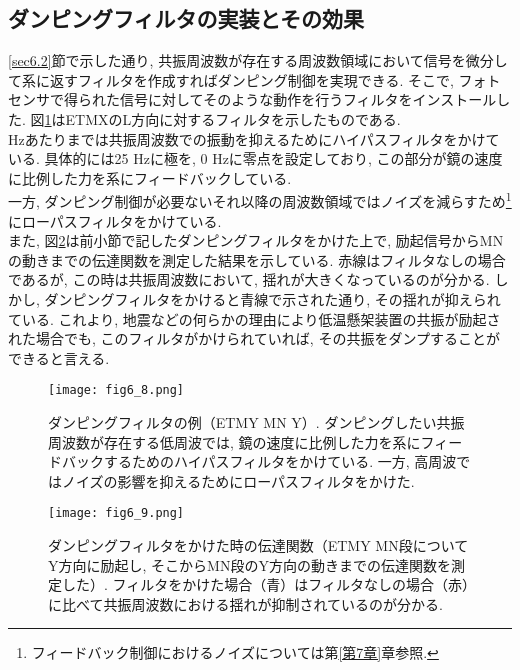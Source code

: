 \subsection{ダンピングフィルタの実装とその効果}
\ref{sec6.2}節で示した通り, 共振周波数が存在する周波数領域において信号を微分して系に返すフィルタを作成すればダンピング制御を実現できる. そこで, フォトセンサで得られた信号に対してそのような動作を行うフィルタをインストールした. 図\ref{fig6.8}はETMXのL方向に対するフィルタを示したものである. \\
 Hzあたりまでは共振周波数での振動を抑えるためにハイパスフィルタをかけている. 具体的には25 Hzに極を, 0 Hzに零点を設定しており, この部分が鏡の速度に比例した力を系にフィードバックしている. \\
\quad 一方, ダンピング制御が必要ないそれ以降の周波数領域ではノイズを減らすため\footnote{フィードバック制御におけるノイズについては第\ref{第7章}章参照. }にローパスフィルタをかけている. \\
\quad また, 図\ref{fig6.9}は前小節で記したダンピングフィルタをかけた上で, 励起信号からMNの動きまでの伝達関数を測定した結果を示している. 赤線はフィルタなしの場合であるが, この時は共振周波数において, 揺れが大きくなっているのが分かる. しかし, ダンピングフィルタをかけると青線で示された通り, その揺れが抑えられている. これより, 地震などの何らかの理由により低温懸架装置の共振が励起された場合でも, このフィルタがかけられていれば, その共振をダンプすることができると言える. 
\begin{figure}[H]
\begin{center}
\texttt{[image: fig6\_8.png]}
\caption[ダンピングフィルタ]{ダンピングフィルタの例（ETMY MN Y）. ダンピングしたい共振周波数が存在する低周波では, 鏡の速度に比例した力を系にフィードバックするためのハイパスフィルタをかけている. 一方, 高周波ではノイズの影響を抑えるためにローパスフィルタをかけた. }
\label{fig6.8}
\end{center}
\end{figure}
\begin{figure}[H]
\begin{center}
\texttt{[image: fig6\_9.png]}
\caption[ダンピングフィルタをかけた時の伝達関数]{ダンピングフィルタをかけた時の伝達関数（ETMY MN段についてY方向に励起し, そこからMN段のY方向の動きまでの伝達関数を測定した）. フィルタをかけた場合（青）はフィルタなしの場合（赤）に比べて共振周波数における揺れが抑制されているのが分かる. }
\label{fig6.9}
\end{center}
\end{figure}
